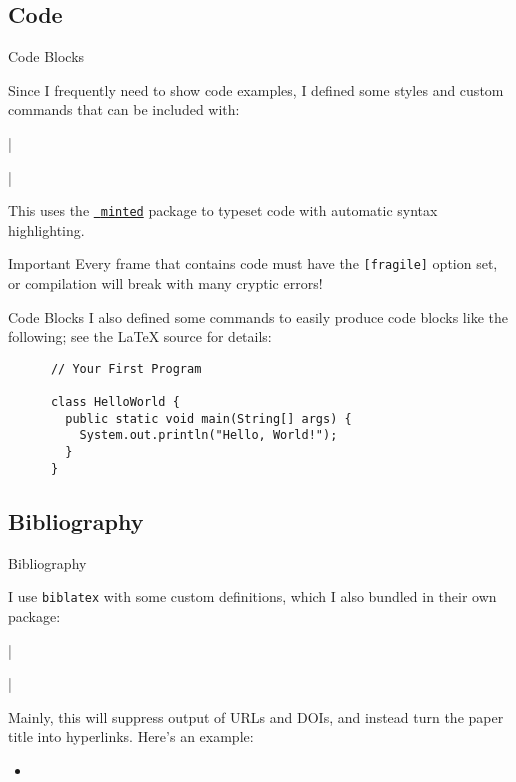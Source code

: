 \documentclass[10pt]{beamer}
\begin{document}
\subsection{Code}
\begin{frame}{Code Blocks}
    
    Since I frequently need to show code examples, I defined some styles and custom commands that can be included with:
    
    |\usepackage{myminted}|
    
    This uses the \href{http://tug.ctan.org/macros/latex/contrib/minted/minted.pdf}{{\small\faExternalLink*}~\texttt{minted}} package to typeset code with automatic syntax highlighting.
    \medskip

    \begin{warningblock}{\faExclamationTriangle{}\enspace{}Important}
    Every frame that contains code must have the \texttt{[fragile]} option set, or compilation will break with many cryptic errors!
    \end{warningblock}
\end{frame}

\begin{frame}[fragile]{Code Blocks}
    I also defined some commands to easily produce code blocks like the following; see the \LaTeX{} source for details:\medskip
    
    \begin{beamercodeblock}\vspace{-.6em}
      \begin{verbatim}
      // Your First Program

      class HelloWorld {
        public static void main(String[] args) {
          System.out.println("Hello, World!"); 
        }
      }
      \end{verbatim}
    \end{beamercodeblock}

\end{frame}


\subsection{Bibliography}
\begin{frame}{Bibliography}
    
    I use \texttt{biblatex} with some custom definitions, which I also bundled in their own package:
    
    |\usepackage{mybiblatex}|
    
    Mainly, this will suppress output of URLs and DOIs, and instead turn the paper title into hyperlinks.  Here's an example:

    \begin{itemize}
        \item {}
    \end{itemize}
\end{frame}
\end{document}
